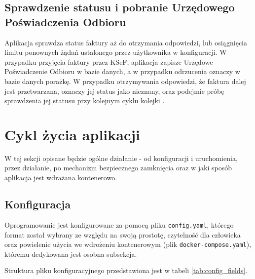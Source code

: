 \subsection{Sprawdzenie statusu i pobranie Urzędowego Poświadczenia Odbioru}
Aplikacja sprawdza status faktury aż do otrzymania odpowiedzi, lub osiągnięcia limitu ponownych żądań ustalonego przez użytkownika w konfiguracji. W przypadku przyjęcia faktury przez KSeF, aplikacja zapisze Urzędowe Poświadczenie Odbioru w bazie danych, a w przypadku odrzucenia oznaczy w bazie danych porażkę. W przypadku otrzymywania odpowiedzi, że faktura dalej jest przetwarzana, oznaczy jej status jako nieznany, oraz podejmie próbę sprawdzenia jej statusu przy kolejnym cyklu kolejki \parencite{ksef_api_docs}.

\section{Cykl życia aplikacji}
W tej sekcji opisane będzie ogólne działanie - od konfiguracji i uruchomienia, przez działanie, po mechanizm bezpiecznego zamknięcia oraz w jaki sposób aplikacja jest wdrażana kontenerowo.

\subsection{Konfiguracja}
Oprogramowanie jest konfigurowane za pomocą pliku \texttt{config.yaml}, którego format został wybrany ze względu na swoją prostotę, czytelność dla człowieka oraz powielenie użycia we wdrożeniu kontenerowym (plik \texttt{docker-compose.yaml}), któremu dedykowana jest osobna subsekcja. 


\noindent Struktura pliku konfiguracyjnego przedstawiona jest w tabeli \ref{tab:config_fields}.

